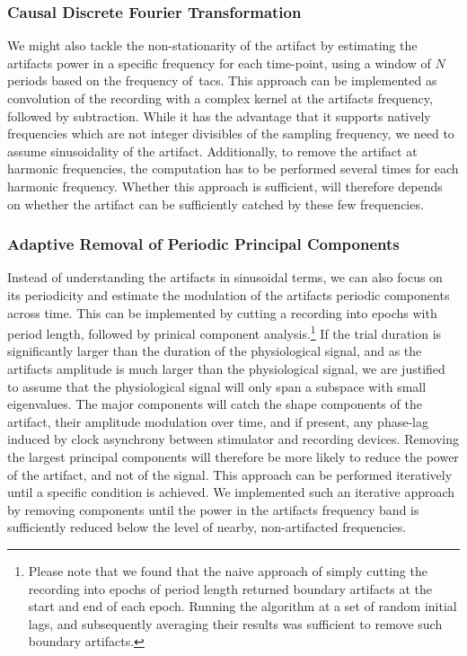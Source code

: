 \documentclass[a4paper]{article}
\begin{document}
\subsubsection{Causal Discrete Fourier Transformation}\label{sec:causalDFT}

We might also tackle the non-stationarity of the artifact by  estimating the artifacts power in a specific frequency for each time-point, using a window of $N$ periods based on the frequency of~\gls{tacs}. This approach can be implemented as convolution of the recording with a complex kernel at the artifacts frequency, followed by subtraction.
While it has the advantage that it supports natively frequencies which are not integer divisibles of the sampling frequency, we need to assume sinusoidality of the artifact. Additionally, to remove the artifact at harmonic frequencies, the computation has to be performed several times for each harmonic frequency.
Whether this approach is sufficient, will therefore depends on whether the artifact can be sufficiently catched by these few frequencies.

\subsubsection{Adaptive Removal of Periodic Principal Components}\label{sec:adaptivePCA}

Instead of understanding the artifacts in sinusoidal terms, we can also focus on its periodicity and estimate the modulation of the artifacts periodic components across time.
This can be implemented by cutting a recording into epochs with period length, followed by prinical component analysis.\footnote{Please note that we found that the naive approach of simply cutting the recording into epochs of period length returned boundary artifacts at the start and end of each epoch. Running the algorithm at a set of random initial lags, and subsequently averaging their results was sufficient to remove such boundary artifacts.}
If the trial duration is significantly larger than the duration of the physiological signal, and as the artifacts amplitude is much larger than the physiological signal, we are justified to assume that the physiological signal will only span a subspace with small eigenvalues.
The major components will catch the shape components of the artifact, their amplitude modulation over time, and if present, any phase-lag induced by clock asynchrony between stimulator and recording devices. Removing the largest principal components will therefore be more likely to reduce the power of the artifact, and not of the signal.
This approach can be performed iteratively until a specific condition is achieved. We implemented such an iterative approach by removing components until the power in the artifacts frequency band is sufficiently reduced below the level of nearby, non-artifacted frequencies.
\end{document}
